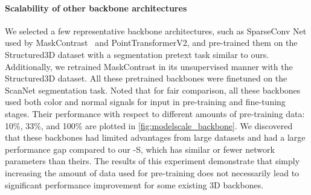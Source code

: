 \documentclass[10pt,twocolumn,letterpaper]{article}
\begin{document}
\paragraph{Scalability of other backbone architectures}
We selected a few representative backbone architectures, such as SparseConv Net used by MaskContrast~\cite{wu2023masked} and PointTransformerV2, and pre-trained them on the Structured3D dataset with a segmentation pretext task similar to ours. Additionally, we retrained MaskContrast in its unsupervised manner with the Structured3D dataset.  All these pretrained backbones were finetuned on the ScanNet segmentation task. Noted that for fair comparison, all these backbones used both color and normal signals for input in pre-training and fine-tuning stages. Their performance with respect to different amounts of pre-training data: 10\%, 33\%, and 100\% are plotted in \cref{fig:modelscale_backbone}. We discovered that these backbones had limited advantages from large datasets and had a large performance gap compared to our \SST-S, which has similar or fewer network parameters than theirs.
The results of this experiment demonstrate that simply increasing the amount of data used for pre-training does not necessarily lead to significant performance improvement for some existing 3D backbones.
\end{document}
